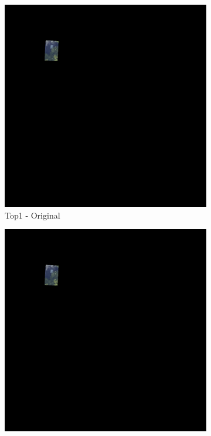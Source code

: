 \begin{figure}[H]
\centering
\begin{subfigure}{0.32\textwidth}
    \includegraphics[width=\textwidth]{02-main//figures/ch4/kfold_ensembles/unetplusplus_tu-efficientnetv2_rw_s.ra2_in1k/worst_cases/worst_4_iou0.000_25011115_tile_17_4_52cb42_original.png}
    \caption{Top1 - Original}
\end{subfigure}
\hfill
\begin{subfigure}{0.32\textwidth}
    \includegraphics[width=\textwidth]{02-main//figures/ch4/kfold_ensembles/unetplusplus_tu-efficientnetv2_rw_s.ra2_in1k/worst_cases/worst_4_iou0.000_25011115_tile_17_4_52cb42_overlay_gt.png}

\end{subfigure}
\end{figure}
